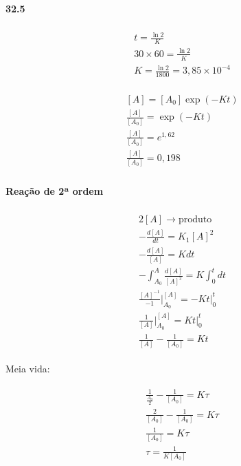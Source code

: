 \paragraph*{32.5}

\begin{gather}
    \begin{align}
        & t = \frac{\ln 2}{K} \\
        & 30 \times 60 = \frac{\ln 2}{K} \\
        & K = \frac{\ln 2}{1800} = 3,85 \times 10^{-4}
    \end{align}
\end{gather}

\begin{gather}
    \begin{align}
        & [A] = [A_0] \exp(-Kt) \\
        & \frac{[A]}{[A_0]} = \exp(-Kt) \\
        & \frac{[A]}{[A_0]} = e^{1,62} \\
        & \frac{[A]}{[A_0]} = 0,198
    \end{align}
\end{gather}

\paragraph*{Reação de 2ª ordem}

\begin{gather}
    \begin{align}
        & 2[A] \rightarrow \text{produto} \\
        & -\frac{d[A]}{dt} = K_1[A]^2 \\
        & -\frac{d[A]}{[A]} = Kdt \\
        & - \int_{A_0}^{A} \frac{d[A]}{[A]^2} = K \int_{0}^{t} dt \\
        & \frac{[A]^{-1}}{-1} \bigg\rvert_{A_0}^{[A]} = -Kt \bigg\rvert_0^t \\
        & \frac{1}{[A]} \bigg\rvert_{A_0}^{[A]} = Kt \bigg\rvert_0^t \\
        & \frac{1}{[A]} - \frac{1}{[A_0]} = Kt
    \end{align}
\end{gather}

Meia vida:

\begin{gather}
    \begin{align}
        & \frac{1}{\frac{A_0}{2}} - \frac{1}{[A_0]} = K \tau \\
        & \frac{2}{[A_0]} - \frac{1}{[A_0]} = K \tau \\
        & \frac{1}{[A_0]} = K \tau \\
        & \tau = \frac{1}{K[A_0]}
    \end{align}
\end{gather}

